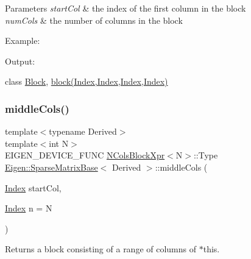 \begin{DoxyParams}{Parameters}
{\em start\+Col} & the index of the first column in the block \\
\hline
{\em num\+Cols} & the number of columns in the block\\
\hline
\end{DoxyParams}
Example\+: 
\begin{DoxyCodeInclude}{0}
\end{DoxyCodeInclude}
 Output\+: 
\begin{DoxyVerbInclude}
\end{DoxyVerbInclude}
 class \mbox{\hyperlink{class_eigen_1_1_block}{Block}}, \mbox{\hyperlink{class_eigen_1_1_sparse_matrix_base_a7c28a2f511181c727396d5e813519d38}{block(\+Index,\+Index,\+Index,\+Index)}} \mbox{\label{class_eigen_1_1_sparse_matrix_base_ac9adf23adf2b74a6fc316d8298d0b210}} 
\subsubsection{\texorpdfstring{middleCols()}{middleCols()}\hspace{0.1cm}{\footnotesize\ttfamily [2/2]}}
{\footnotesize\ttfamily template$<$typename Derived$>$ \\
template$<$int N$>$ \\
E\+I\+G\+E\+N\+\_\+\+D\+E\+V\+I\+C\+E\+\_\+\+F\+U\+NC \mbox{\hyperlink{struct_eigen_1_1_sparse_matrix_base_1_1_n_cols_block_xpr}{N\+Cols\+Block\+Xpr}}$<$N$>$\+::Type \mbox{\hyperlink{class_eigen_1_1_sparse_matrix_base}{Eigen\+::\+Sparse\+Matrix\+Base}}$<$ Derived $>$\+::middle\+Cols (\begin{DoxyParamCaption}\item[{\mbox{\hyperlink{struct_eigen_1_1_eigen_base_a554f30542cc2316add4b1ea0a492ff02}{Index}}}]{start\+Col,  }\item[{\mbox{\hyperlink{struct_eigen_1_1_eigen_base_a554f30542cc2316add4b1ea0a492ff02}{Index}}}]{n = {\ttfamily N} }\end{DoxyParamCaption})\hspace{0.3cm}{\ttfamily [inline]}}

\begin{DoxyReturn}{Returns}
a block consisting of a range of columns of $\ast$this.
\end{DoxyReturn}

